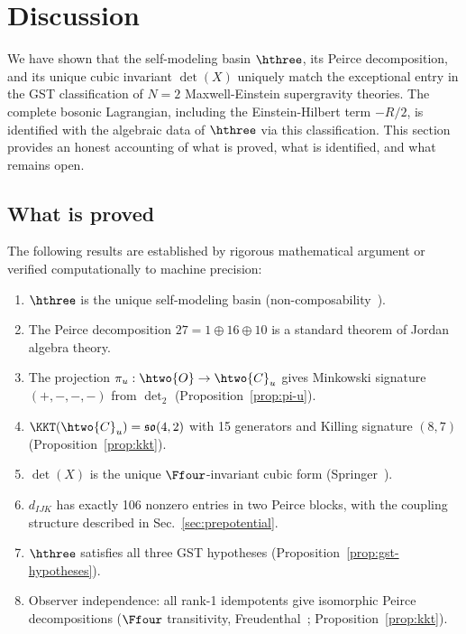 
\section{Discussion}
\label{sec:discussion}

We have shown that the self-modeling basin $\hthree$, its Peirce
decomposition, and its unique cubic invariant $\det(X)$ uniquely match
the exceptional entry in the GST classification of $N{=}2$
Maxwell-Einstein supergravity theories. The complete bosonic Lagrangian,
including the Einstein-Hilbert term $-R/2$, is identified with the
algebraic data of $\hthree$ via this classification. This section
provides an honest accounting of what is proved, what is identified, and
what remains open.

\subsection{What is proved}

The following results are established by rigorous mathematical argument
or verified computationally to machine precision:

\begin{enumerate}
\item $\hthree$ is the unique self-modeling basin
  (non-composability~\cite{BarnumGraydonWilce2020}).

\item The Peirce decomposition $27 = 1 \oplus 16 \oplus 10$ is a
  standard theorem of Jordan algebra theory.

\item The projection $\pi_u : \htwo{O} \to \htwo{C}_u$ gives Minkowski
  signature $(+,-,-,-)$ from $\det_2$
  (Proposition~\ref{prop:pi-u}).

\item $\KKT(\htwo{C}_u) = \mathfrak{so}(4,2)$ with 15 generators and
  Killing signature $(8,7)$ (Proposition~\ref{prop:kkt}).

\item $\det(X)$ is the unique $\Ffour$-invariant cubic form
  (Springer~\cite{Springer1962}).

\item $d_{IJK}$ has exactly 106 nonzero entries in two Peirce blocks,
  with the coupling structure described in
  Sec.~\ref{sec:prepotential}.

\item $\hthree$ satisfies all three GST hypotheses
  (Proposition~\ref{prop:gst-hypotheses}).

\item Observer independence: all rank-1 idempotents give isomorphic
  Peirce decompositions ($\Ffour$ transitivity,
  Freudenthal~\cite{Freudenthal1954};
  Proposition~\ref{prop:kkt}).
\end{enumerate}

